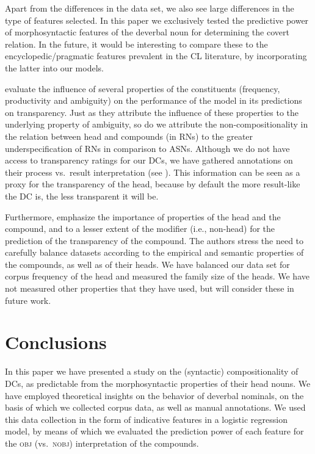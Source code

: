 \documentclass[output=paper]{langsci/langscibook}
\begin{document}
Apart from the differences in the data set, we also see large differences in the type of features selected. In this paper we exclusively 
tested the predictive power of morphosyntactic features of the deverbal noun for determining the covert relation. In the future, it would be interesting to compare these to the encyclopedic/pragmatic features prevalent in the CL literature, by incorporating the latter into our models.

\cite{SchulteImWaldeEtAl:16} evaluate the influence of several properties of the constituents (frequency, productivity and ambiguity) on the performance of the model in its predictions on transparency. Just as they attribute the influence of these properties to the underlying property of ambiguity, 
so do we attribute the non-compositionality in the relation between head and compounds (in RNs) to the greater underspecification of RNs in comparison to ASNs. Although we do not have access to transparency ratings for our DCs, we have gathered annotations on their process vs.\ result interpretation (see ). This information can be seen as a proxy for the transparency of the head, because by default the more result-like the DC is, the less transparent it will be.

Furthermore, \cite{SchulteImWaldeEtAl:16} emphasize the importance of properties of the head and the compound, and to a lesser extent of the modifier (i.e., non-head) for the prediction of the  transparency of the compound.  The authors stress the need to carefully balance  datasets according to the empirical and semantic properties of the compounds, as well as of their heads. We have balanced our data set for corpus frequency of the head   and measured the family size of the heads. We have not measured  other properties that they have used, but will consider these in future work. 

\section{Conclusions}\label{sec:conclusions}

In this paper we have presented a study on the  {(syntactic)} compositionality of DCs, as predictable from the morphosyntactic properties of their head nouns. We have employed theoretical insights on the behavior of deverbal nominals, on the basis of which we collected corpus data, as well as manual annotations. We used this data collection in the form  of indicative features in a logistic regression model, by means of which we evaluated the prediction power of each feature for the \textsc{obj} (vs.~\textsc{nobj}) interpretation of the compounds. 
\end{document}
